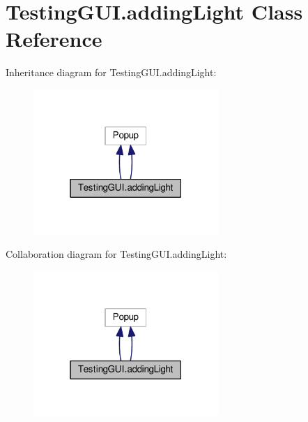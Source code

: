 \hypertarget{classTestingGUI_1_1addingLight}{}\section{Testing\+G\+U\+I.\+adding\+Light Class Reference}
\label{classTestingGUI_1_1addingLight}


Inheritance diagram for Testing\+G\+U\+I.\+adding\+Light\+:\nopagebreak
\begin{figure}[H]
\begin{center}
\leavevmode
\includegraphics[width=199pt]{classTestingGUI_1_1addingLight__inherit__graph}
\end{center}
\end{figure}


Collaboration diagram for Testing\+G\+U\+I.\+adding\+Light\+:\nopagebreak
\begin{figure}[H]
\begin{center}
\leavevmode
\includegraphics[width=199pt]{classTestingGUI_1_1addingLight__coll__graph}
\end{center}
\end{figure}
